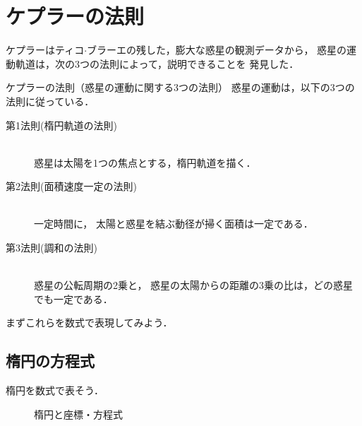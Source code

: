     \section{ケプラーの法則}
            ケプラーはティコ$\cdot$ブラーエの残した，膨大な惑星の観測データから，
            惑星の運動軌道は，次の3つの法則によって，説明できることを
            発見した．
            \begin{myshadebox}{ケプラーの法則（惑星の運動に関する3つの法則）}
                惑星の運動は，以下の3つの法則に従っている．
                \begin{description}
                    \item[第1法則(楕円軌道の法則)]\mbox{}\\
                      惑星は太陽を1つの焦点とする，楕円軌道を描く．
                    \item[第2法則(面積速度一定の法則)]\mbox{}\\
                      一定時間に， 太陽と惑星を結ぶ動径が掃く面積は一定である．
                    \item[第3法則(調和の法則)]\mbox{}\\
                      惑星の公転周期の2乗と， 惑星の太陽からの距離の3乗の比は，どの惑星でも一定である．
                \end{description}
            \end{myshadebox}

            まずこれらを数式で表現してみよう．

        \subsection{楕円の方程式}
            楕円を数式で表そう．
            \begin{figure}[hbt]
                \begin{center}
                    \caption{楕円と座標・方程式}
                    \label{fig:daen_kepler}
                \end{center}
            \end{figure}


